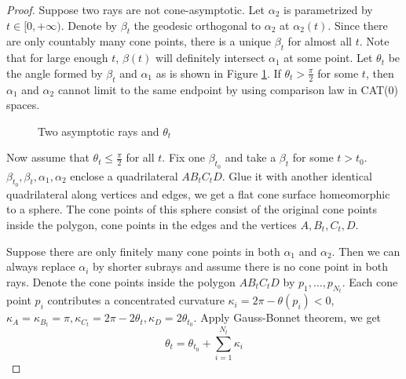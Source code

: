 \documentclass[10pt,a4paper]{amsart}
\begin{document}
\begin{proof}
Suppose two rays are not cone-asymptotic. Let $\alpha_2$ is parametrized by $t\in[0,+\infty)$. Denote by $\beta_t$ the geodesic orthogonal to $\alpha_2$ at $\alpha_2(t)$. Since there are only countably many cone points, there is a unique $\beta_t$ for almost all $t$. Note that for large enough $t$, $\beta(t)$ will definitely intersect $\alpha_1$ at some point. Let $\theta_t$ be the angle formed by $\beta_t$ and $\alpha_1$ as is shown in Figure \ref{varying}. If $\theta_t>\frac{\pi}{2}$ for some $t$, then $\alpha_1$ and $\alpha_2$ cannot limit to the same endpoint by using comparison law in CAT(0) spaces.

\begin{figure}[h]
    \centering
    \caption{Two asymptotic rays and $\theta_t$}
    \label{varying}
\end{figure}

Now assume that $\theta_t\le\frac{\pi}{2}$ for all $t$. Fix one $\beta_{t_0}$ and take a $\beta_t$ for some $t>t_0$. $\beta_{t_0},\beta_t,\alpha_1,\alpha_2$ enclose a quadrilateral $AB_tC_tD$. Glue it with another identical quadrilateral along vertices and edges, we get a flat cone surface homeomorphic to a sphere. The cone points of this sphere consist of the original cone points inside the polygon, cone points in the edges and the vertices $A,B_t,C_t,D$.

Suppose there are only finitely many cone points in both $\alpha_1$ and $\alpha_2$. Then we can always replace $\alpha_i$ by shorter subrays and assume there is no cone point in both rays. Denote the cone points inside the polygon $AB_tC_tD$ by $p_1,\ldots,p_{N_t}$. Each cone point $p_i$ contributes a concentrated curvature $\kappa_i=2\pi-\theta(p_i)<0$, $\kappa_A=\kappa_{B_t}=\pi, \kappa_{C_t}=2\pi-2\theta_t, \kappa_{D}=2\theta_{t_0}$. Apply Gauss-Bonnet theorem, we get
\[\theta_t=\theta_{t_0}+\sum_{i=1}^{N_t}\kappa_i\]


\end{proof}
\end{document}
